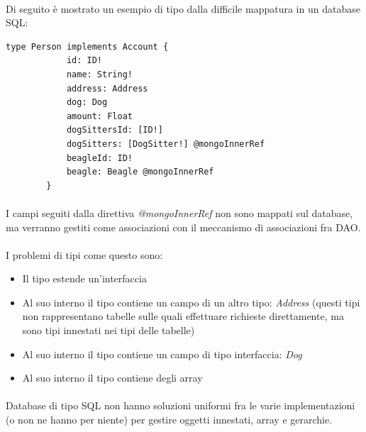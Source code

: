 \documentclass[a4paper, 12pt]{report}
\begin{document}
    \paragraph*{}
    Di seguito è mostrato un esempio di tipo dalla difficile mappatura in un database SQL:
      \begin{Verbatim}[samepage=true]
        type Person implements Account {
            id: ID!
            name: String!
            address: Address
            dog: Dog
            amount: Float
            dogSittersId: [ID!]
            dogSitters: [DogSitter!] @mongoInnerRef
            beagleId: ID!
            beagle: Beagle @mongoInnerRef
        }
      \end{Verbatim}
      \paragraph*{}
      I campi seguiti dalla direttiva \emph{@mongoInnerRef} non sono mappati sul database, ma verranno gestiti come associazioni con il meccanismo di associazioni fra DAO.
      \paragraph*{}
      I problemi di tipi come questo sono:
      \begin{itemize}
        \item Il tipo estende un'interfaccia
        \item Al suo interno il tipo contiene un campo di un altro tipo: \emph{Address} (questi tipi non rappresentano tabelle sulle quali effettuare richieste direttamente, ma sono tipi innestati nei tipi delle tabelle)
        \item Al suo interno il tipo contiene un campo di tipo interfaccia: \emph{Dog}
        \item Al suo interno il tipo contiene degli array
      \end{itemize}
      \paragraph*{}
      Database di tipo SQL non hanno soluzioni uniformi fra le varie implementazioni (o non ne hanno per niente) per gestire oggetti innestati, array e gerarchie.
\end{document}
